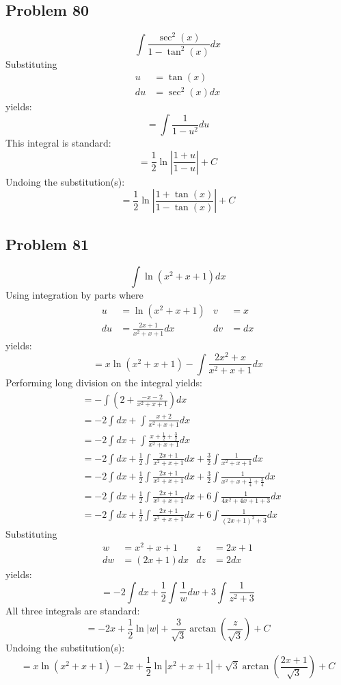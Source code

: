 \documentclass{article}
\begin{document}
\subsection*{Problem 80}
$$\int\frac{\sec^2\left(x\right)}{1-\tan^2\left(x\right)}dx$$
Substituting
\begin{align*}
u&=\tan(x) \\
du&=\sec^2(x)dx
\end{align*}
yields:
$$=\int\frac{1}{1-u^2}du$$
This integral is standard:
$$=\frac{1}{2}\ln\left|\frac{1+u}{1-u}\right|+C$$
Undoing the substitution(s):
$$=\frac{1}{2}\ln\left|\frac{1+\tan(x)}{1-\tan(x)}\right|+C$$
\subsection*{Problem 81}
$$\int\ln\left(x^2+x+1\right)dx$$
Using integration by parts where
\begin{align*}
u&=\ln(x^2+x+1) &v&=x \\
du&=\frac{2x+1}{x^2+x+1}dx &dv&=dx
\end{align*}
yields:
$$=x\ln(x^2+x+1)-\int\frac{2x^2+x}{x^2+x+1}dx$$
Performing long division on the integral yields:
\begin{align*}
&=-\int\left(2+\frac{-x-2}{x^2+x+1}\right)dx \\
&=-2\int dx+\int\frac{x+2}{x^2+x+1}dx \\
&=-2\int dx+\int\frac{x+\frac{1}{2}+\frac{3}{2}}{x^2+x+1}dx \\
&=-2\int dx+\frac{1}{2}\int\frac{2x+1}{x^2+x+1}dx+\frac{3}{2}\int\frac{1}{x^2+x+1}dx \\
&=-2\int dx+\frac{1}{2}\int\frac{2x+1}{x^2+x+1}dx+\frac{3}{2}\int\frac{1}{x^2+x+\frac{1}{4}+\frac{3}{4}}dx \\
&=-2\int dx+\frac{1}{2}\int\frac{2x+1}{x^2+x+1}dx+6\int\frac{1}{4x^2+4x+1+3}dx \\
&=-2\int dx+\frac{1}{2}\int\frac{2x+1}{x^2+x+1}dx+6\int\frac{1}{(2x+1)^2+3}dx
\end{align*}
Substituting
\begin{align*}
w&=x^2+x+1 &z&=2x+1 \\
dw&=(2x+1)dx &dz&=2dx
\end{align*}
yields:
$$=-2\int dx+\frac{1}{2}\int\frac{1}{w}dw+3\int\frac{1}{z^2+3}$$
All three integrals are standard:
$$=-2x+\frac{1}{2}\ln|w|+\frac{3}{\sqrt{3}}\arctan\left(\frac{z}{\sqrt{3}}\right)+C$$
Undoing the substitution(s):
$$=x\ln(x^2+x+1)-2x+\frac{1}{2}\ln\left|x^2+x+1\right|+\sqrt{3}\arctan\left(\frac{2x+1}{\sqrt{3}}\right)+C$$
\end{document}

